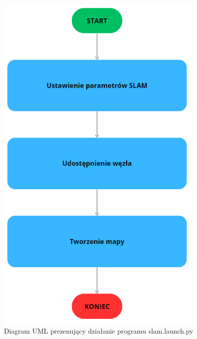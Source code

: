 \documentclass[a4paper,twoside,12pt]{book}
\begin{document}
\begin{figure}[!hb]
	\centering
	\includegraphics[width=0.9\textwidth]{images/uml-local.png}
	\caption{Diagram UML prezenujący działanie programu slam.launch.py}
	\label{fig:diagram-loc}
\end{figure}
\end{document}
